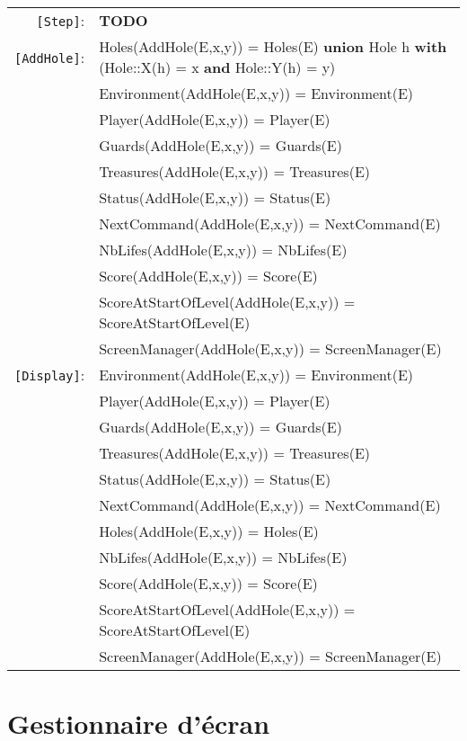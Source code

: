 \documentclass[7pt]{article}
\begin{document}
\begin{tabular}{rl}
       \texttt{[Step]}: & \textbf{TODO\
} \\
    \texttt{[AddHole]}: & Holes(AddHole(E,x,y)) = Holes(E) \textbf{union} Hole h \textbf{ with} (Hole::X(h) = x \textbf{and} Hole::Y(h) = y) \\
       & Environment(AddHole(E,x,y)) = Environment(E) \\
       & Player(AddHole(E,x,y)) = Player(E) \\
       & Guards(AddHole(E,x,y)) = Guards(E) \\
       & Treasures(AddHole(E,x,y)) = Treasures(E) \\
       & Status(AddHole(E,x,y)) = Status(E) \\
       & NextCommand(AddHole(E,x,y)) = NextCommand(E) \\
       & NbLifes(AddHole(E,x,y)) = NbLifes(E) \\
       & Score(AddHole(E,x,y)) = Score(E) \\
       & ScoreAtStartOfLevel(AddHole(E,x,y)) = ScoreAtStartOfLevel(E) \\
       & ScreenManager(AddHole(E,x,y)) = ScreenManager(E) \\
       
       \texttt{[Display]}: & Environment(AddHole(E,x,y)) = Environment(E) \\
       & Player(AddHole(E,x,y)) = Player(E) \\
       & Guards(AddHole(E,x,y)) = Guards(E) \\
       & Treasures(AddHole(E,x,y)) = Treasures(E) \\
       & Status(AddHole(E,x,y)) = Status(E) \\
       & NextCommand(AddHole(E,x,y)) = NextCommand(E) \\
       & Holes(AddHole(E,x,y)) = Holes(E) \\
       & NbLifes(AddHole(E,x,y)) = NbLifes(E) \\
       & Score(AddHole(E,x,y)) = Score(E) \\
       & ScoreAtStartOfLevel(AddHole(E,x,y)) = ScoreAtStartOfLevel(E) \\
       & ScreenManager(AddHole(E,x,y)) = ScreenManager(E) \\

\end{tabular}
\newpage

\section*{Gestionnaire d'écran}
\end{document}
